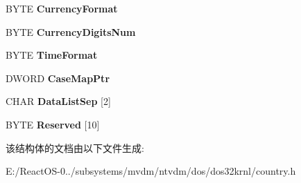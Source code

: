\begin{DoxyCompactItemize}
B\+Y\+TE {\bfseries Currency\+Format}
\item 
\mbox{\label{struct___d_o_s___c_o_u_n_t_r_y___i_n_f_o_aa4ec9ec076a3569a478d3fd7f84855e6}} 
B\+Y\+TE {\bfseries Currency\+Digits\+Num}
\item 
\mbox{\label{struct___d_o_s___c_o_u_n_t_r_y___i_n_f_o_a8688fd434b22e642cc1cf78f65a47611}} 
B\+Y\+TE {\bfseries Time\+Format}
\item 
\mbox{\label{struct___d_o_s___c_o_u_n_t_r_y___i_n_f_o_a86975426a70f568b9613bb9a8f6e8841}} 
D\+W\+O\+RD {\bfseries Case\+Map\+Ptr}
\item 
\mbox{\label{struct___d_o_s___c_o_u_n_t_r_y___i_n_f_o_a38558cf201f68dec93ca1f3e41b2b183}} 
C\+H\+AR {\bfseries Data\+List\+Sep} \mbox{[}2\mbox{]}
\item 
\mbox{\label{struct___d_o_s___c_o_u_n_t_r_y___i_n_f_o_ae6d3e5234aab6fbaf0994d5b51b327d0}} 
B\+Y\+TE {\bfseries Reserved} \mbox{[}10\mbox{]}
\end{DoxyCompactItemize}


该结构体的文档由以下文件生成\+:\begin{DoxyCompactItemize}
\item 
E\+:/\+React\+O\+S-\/0../subsystems/mvdm/ntvdm/dos/dos32krnl/country.\+h\end{DoxyCompactItemize}
